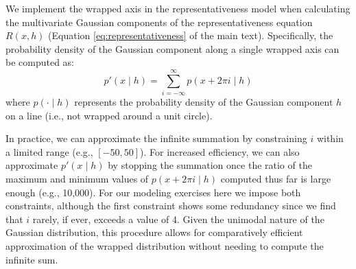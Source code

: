 \documentclass[pdflatex,sn-apa]{sn-jnl}%
\theoremstyle{thmstyleone}%
\theoremstyle{thmstyletwo}%
\theoremstyle{thmstylethree}%
\begin{document}
\begin{appendices}
We implement the wrapped axis in the representativeness model when
calculating the multivariate Gaussian components of the representativeness equation
$R(x,h)$ (Equation \ref{eq:representativeness} of the main text). Specifically,
the probability density of the Gaussian component along a single wrapped axis can be computed as:
\begin{equation}
p'(x \mid h) = \sum_{i=-\infty}^{\infty} p(x + 2\pi i \mid h)
\end{equation}
where $p(\cdot \mid h)$ represents the probability density of the Gaussian component $h$
on a line (i.e., not wrapped around a unit circle).

In practice, we can approximate the infinite summation by constraining $i$
within a limited range (e.g., $[-50,50]$). For increased efficiency, we can also
approximate $p'(x \mid h)$ by stopping the summation once the ratio of the maximum
and minimum values of $p(x + 2\pi i  \mid h)$ computed thus far is large enough (e.g.,
10,000). For our modeling exercises here we impose both constraints, although the
first constraint shows some redundancy since we find that $i$ rarely, if ever,
exceeds a value of 4. Given the unimodal nature of the Gaussian distribution,
this procedure allows for comparatively efficient approximation of the wrapped
distribution without needing to compute the infinite sum.

\end{appendices}





\end{document}
